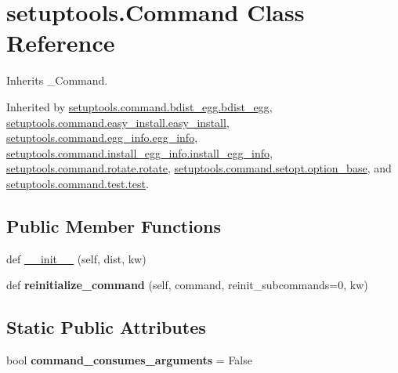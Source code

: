 \hypertarget{classsetuptools_1_1_command}{}\section{setuptools.\+Command Class Reference}
\label{classsetuptools_1_1_command}


Inherits \+\_\+\+Command.



Inherited by \hyperlink{classsetuptools_1_1command_1_1bdist__egg_1_1bdist__egg}{setuptools.\+command.\+bdist\+\_\+egg.\+bdist\+\_\+egg}, \hyperlink{classsetuptools_1_1command_1_1easy__install_1_1easy__install}{setuptools.\+command.\+easy\+\_\+install.\+easy\+\_\+install}, \hyperlink{classsetuptools_1_1command_1_1egg__info_1_1egg__info}{setuptools.\+command.\+egg\+\_\+info.\+egg\+\_\+info}, \hyperlink{classsetuptools_1_1command_1_1install__egg__info_1_1install__egg__info}{setuptools.\+command.\+install\+\_\+egg\+\_\+info.\+install\+\_\+egg\+\_\+info}, \hyperlink{classsetuptools_1_1command_1_1rotate_1_1rotate}{setuptools.\+command.\+rotate.\+rotate}, \hyperlink{classsetuptools_1_1command_1_1setopt_1_1option__base}{setuptools.\+command.\+setopt.\+option\+\_\+base}, and \hyperlink{classsetuptools_1_1command_1_1test_1_1test}{setuptools.\+command.\+test.\+test}.

\subsection*{Public Member Functions}
\begin{DoxyCompactItemize}
\item 
def \hyperlink{classsetuptools_1_1_command_a14ec5a9290a2b78f0ffe85b0144374b0}{\+\_\+\+\_\+init\+\_\+\+\_\+} (self, dist, kw)
\item 
\mbox{\label{classsetuptools_1_1_command_a0f2625d346bd4fd112eb84c199cb3951}} 
def {\bfseries reinitialize\+\_\+command} (self, command, reinit\+\_\+subcommands=0, kw)
\end{DoxyCompactItemize}
\subsection*{Static Public Attributes}
\begin{DoxyCompactItemize}
\item 
\mbox{\label{classsetuptools_1_1_command_ab8d0e32eac3aedfa2c21950afbf30764}} 
bool {\bfseries command\+\_\+consumes\+\_\+arguments} = False
\end{DoxyCompactItemize}


